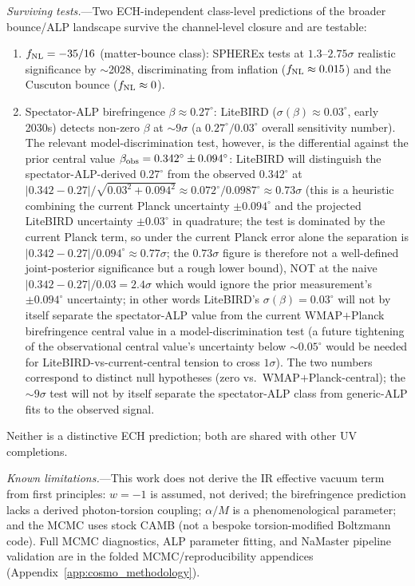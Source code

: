 \documentclass[aps,prd,twocolumn,superscriptaddress,showpacs,preprintnumbers,nofootinbib,longbibliography,floatfix]{revtex4-2}
\newcommand{\fnl}{f_{\rm NL}}
\begin{document}
\textit{Surviving tests.}---Two ECH-independent class-level predictions of the broader
bounce/ALP landscape survive the channel-level closure and are testable:
\begin{enumerate}[leftmargin=*]
\item $\fnl = -35/16$ (matter-bounce class): SPHEREx tests at $1.3$--$2.75\sigma$
realistic significance by $\sim$2028, discriminating from inflation
($\fnl\approx 0.015$) and the Cuscuton bounce ($\fnl\approx 0$).
\item Spectator-ALP birefringence $\beta\approx 0.27^\circ$: LiteBIRD ($\sigma(\beta)\approx 0.03^\circ$, early 2030s) detects non-zero $\beta$ at $\sim 9\sigma$ (a $0.27^\circ/0.03^\circ$ overall sensitivity number). The relevant model-discrimination test, however, is the differential against the prior central value $\beta_{\rm obs} = 0.342^\circ \pm 0.094^\circ$: LiteBIRD will distinguish the spectator-ALP-derived $0.27^\circ$ from the observed $0.342^\circ$ at $\bigl|0.342-0.27\bigr|/\sqrt{0.03^2 + 0.094^2} \approx 0.072^\circ/0.0987^\circ \approx 0.73\sigma$ (this is a heuristic combining the current Planck uncertainty $\pm 0.094^\circ$ and the projected LiteBIRD uncertainty $\pm 0.03^\circ$ in quadrature; the test is dominated by the current Planck term, so under the current Planck error alone the separation is $\bigl|0.342-0.27\bigr|/0.094^\circ \approx 0.77\sigma$; the $0.73\sigma$ figure is therefore not a well-defined joint-posterior significance but a rough lower bound), NOT at the naive $\bigl|0.342-0.27\bigr|/0.03 = 2.4\sigma$ which would ignore the prior measurement's $\pm 0.094^\circ$ uncertainty; in other words LiteBIRD's $\sigma(\beta)\!=\!0.03^\circ$ will not by itself separate the spectator-ALP value from the current WMAP$+$Planck birefringence central value in a model-discrimination test (a future tightening of the observational central value's uncertainty below $\sim 0.05^\circ$ would be needed for LiteBIRD-vs-current-central tension to cross $1\sigma$). The two numbers correspond to distinct null hypotheses (zero vs.\ WMAP$+$Planck-central); the $\sim 9\sigma$ test will not by itself separate the spectator-ALP class from generic-ALP fits to the observed signal.
\end{enumerate}
Neither is a distinctive ECH prediction; both are shared with other UV completions.

\textit{Known limitations.}---This work does not derive the IR effective vacuum
term from first principles: $w=-1$ is assumed, not derived; the birefringence
prediction lacks a derived photon-torsion coupling; $\alpha/M$ is a
phenomenological parameter; and the MCMC uses stock CAMB (not a bespoke
torsion-modified Boltzmann code). Full MCMC diagnostics, ALP parameter fitting,
and NaMaster pipeline validation are in the folded MCMC/reproducibility appendices (Appendix~\ref{app:cosmo_methodology}).
\end{document}

